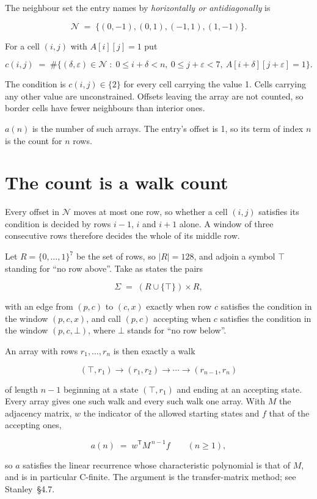 \documentclass[11pt]{article}
\theoremstyle{definition}
\begin{document}
The neighbour set the entry names by {\itshape horizontally or antidiagonally} is

\[\mathcal{N} \;=\; \{(0,-1), (0,1), (-1,1), (1,-1)\}.\]

For a cell $(i,j)$ with $A[i][j] = 1$ put

\[c(i,j) \;=\; \#\bigl\{(\delta,\varepsilon)\in\mathcal{N} \;:\; 0\le i+\delta<n,\ 0\le j+\varepsilon<7,\ A[i+\delta][j+\varepsilon] = 1\bigr\}.\]

The condition is $c(i,j) \in \{2\}$ for every cell carrying the value 1. Cells carrying any other value are unconstrained. Offsets leaving the array are not counted, so border cells have fewer neighbours than interior ones.

$a(n)$ is the number of such arrays. The entry's offset is 1, so its term of index $n$ is the count for $n$ rows.

\section{The count is a walk count}

Every offset in $\mathcal{N}$ moves at most one row, so whether a cell $(i,j)$ satisfies its condition is decided by rows $i-1$, $i$ and $i+1$ alone. A window of three consecutive rows therefore decides the whole of its middle row.

Let $R = \{0,\dots,1\}^{7}$ be the set of rows, so $|R| = 128$, and adjoin a symbol $\top$ standing for ``no row above''. Take as states the pairs

\[\Sigma \;=\; (R \cup \{\top\}) \times R,\]

with an edge from $(p,c)$ to $(c,x)$ exactly when row $c$ satisfies the condition in the window $(p,c,x)$, and call $(p,c)$ accepting when $c$ satisfies the condition in the window $(p,c,\bot)$, where $\bot$ stands for ``no row below''.

An array with rows $r_1,\dots,r_n$ is then exactly a walk

\[(\top,r_1) \to (r_1,r_2) \to \cdots \to (r_{n-1},r_n)\]

of length $n-1$ beginning at a state $(\top,r_1)$ and ending at an accepting state. Every array gives one such walk and every such walk one array. With $M$ the adjacency matrix, $w$ the indicator of the allowed starting states and $f$ that of the accepting ones,

\[a(n) \;=\; w^{\mathsf T} M^{\,n-1} f \qquad (n \ge 1),\]

so $a$ satisfies the linear recurrence whose characteristic polynomial is that of $M$, and is in particular C-finite. The argument is the transfer-matrix method; see Stanley~\S4.7.
\end{document}

